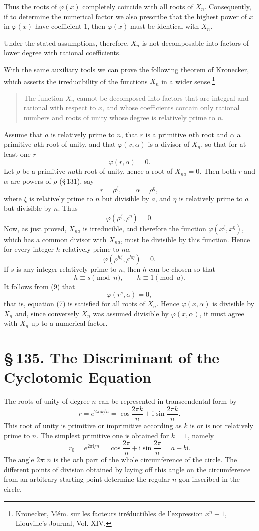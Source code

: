 \documentclass[11pt]{article}
\providecommand{\sect}[2]{\section*{\S\,#1. #2}}
\providecommand{\ii}{\mathrm{i}}
\begin{document}
Thus the roots of $\varphi(x)$ completely coincide with all roots of $X_n$. Consequently, if to determine the numerical factor we also prescribe that the highest power of $x$ in $\varphi(x)$ have coefficient $1$, then $\varphi(x)$ must be identical with $X_n$.

Under the stated assumptions, therefore, $X_n$ is not decomposable into factors of lower degree with rational coefficients.

With the same auxiliary tools we can prove the following theorem of Kronecker, which asserts the irreducibility of the functions $X_n$ in a wider sense.\footnote{Kronecker, Mém. sur les facteurs irréductibles de l'expression $x^n-1$, Liouville's Journal, Vol. XIV.}
\begin{quote}
The function $X_n$ cannot be decomposed into factors that are integral and rational with respect to $x$, and whose coefficients contain only rational numbers and roots of unity whose degree is relatively prime to $n$.
\end{quote}
Assume that $a$ is relatively prime to $n$, that $r$ is a primitive $n$th root and $\alpha$ a primitive $a$th root of unity, and that $\varphi(x,\alpha)$ is a divisor of $X_n$, so that for at least one $r$
\[
\tag{7}        \varphi(r,\alpha)=0.
\]
Let $\rho$ be a primitive $na$th root of unity, hence a root of $X_{na}=0$. Then both $r$ and $\alpha$ are powers of $\rho$ (\S\,131), say
\[
        r=\rho^\xi,
        \qquad
        \alpha=\rho^\eta,
\]
where $\xi$ is relatively prime to $n$ but divisible by $a$, and $\eta$ is relatively prime to $a$ but divisible by $n$. Thus
\[
\tag{8}        \varphi(\rho^\xi,\rho^\eta)=0.
\]
Now, as just proved, $X_{na}$ is irreducible, and therefore the function $\varphi(x^\xi,x^\eta)$, which has a common divisor with $X_{na}$, must be divisible by this function. Hence for every integer $h$ relatively prime to $na$,
\[
\tag{9}        \varphi(\rho^{h\xi},\rho^{h\eta})=0.
\]
If $s$ is any integer relatively prime to $n$, then $h$ can be chosen so that
\[
        h\equiv s\pmod n,
        \qquad
        h\equiv1\pmod a.
\]
It follows from (9) that
\[
        \varphi(r^s,\alpha)=0,
\]
that is, equation (7) is satisfied for all roots of $X_n$. Hence $\varphi(x,\alpha)$ is divisible by $X_n$ and, since conversely $X_n$ was assumed divisible by $\varphi(x,\alpha)$, it must agree with $X_n$ up to a numerical factor.

\sect{135}{The Discriminant of the Cyclotomic Equation}

The roots of unity of degree $n$ can be represented in transcendental form by
\[
\tag{1}        r=e^{2\pi \ii k/n}=\cos\frac{2\pi k}{n}+\ii\sin\frac{2\pi k}{n}.
\]
This root of unity is primitive or imprimitive according as $k$ is or is not relatively prime to $n$. The simplest primitive one is obtained for $k=1$, namely
\[
\tag{2}        r_0=e^{2\pi \ii/n}=\cos\frac{2\pi}{n}+\ii\sin\frac{2\pi}{n}=a+b\ii.
\]
The angle $2\pi:n$ is the $n$th part of the whole circumference of the circle. The different points of division obtained by laying off this angle on the circumference from an arbitrary starting point determine the regular $n$-gon inscribed in the circle.
\end{document}
